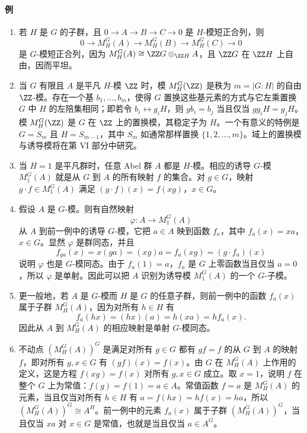\paragraph{例}
\begin{enumerate}[label=(\arabic*)]
  \item 若 $H$ 是 $G$ 的子群，且 $0\to A\to B\to C\to0$ 是 $H$-模短正合列，则
  \[
    0\to M_H^G(A)\to M_H^G(B)\to M_H^G(C)\to0
  \]
  是 $G$-模短正合列，因为 $M_H^G(A)\cong\ZZ G\otimes_{\ZZ H}A$，且 $\ZZ G$ 在 $\ZZ H$ 上自由，因而平坦。
  \item 当 $G$ 有限且 $A$ 是平凡 $H$-模 $\ZZ$ 时，模 $M_H^G(\ZZ)$ 是秩为 $m=|G:H|$ 的自由 $\ZZ$-模。存在一个基 $b_1,
  \ldots,b_m$，使得 $G$ 置换这些基元素的方式与它左乘置换 $G$ 中 $H$ 的左陪集相同；即若令 $b_i\leftrightarrow g_iH$，则 $gb_i=b_j$ 当且仅当 $gg_iH=g_jH$。模 $M_H^G(\ZZ)$ 是 $G$ 在 $\ZZ$ 上的置换模，其稳定子为 $H$。一个有意义的特例是 $G=S_m$ 且 $H=S_{m-1}$，其中 $S_m$ 如通常那样置换 $\{1,2,
  \ldots,m\}$。域上的置换模与诱导模将在第 VI 部分中研究。
  \item 当 $H=1$ 是平凡群时，任意 Abel 群 $A$ 都是 $H$-模。相应的诱导 $G$-模 $M_1^G(A)$ 就是从 $G$ 到 $A$ 的所有映射 $f$ 的集合。对 $g\in G$，映射 $g\cdot f\in M_1^G(A)$ 满足 $(g\cdot f)(x)=f(xg)$，$x\in G$。
  \item 假设 $A$ 是 $G$-模。则有自然映射
  \[
    \varphi:A\to M_1^G(A)
  \]
  从 $A$ 到前一例中的诱导 $G$-模，它把 $a\in A$ 映到函数 $f_a$，其中 $f_a(x)=xa$，$x\in G$。显然 $\varphi$ 是群同态，并且
  \[
    f_{ga}(x)=x(ga)=(xg)a=f_a(xg)=(g\cdot f_a)(x)
  \]
  说明 $\varphi$ 也是 $G$-模同态。由于 $f_a(1)=a$，$f_a$ 是 $G$ 上零函数当且仅当 $a=0$，所以 $\varphi$ 是单射。因此可以把 $A$ 识别为诱导模 $M_1^G(A)$ 的一个 $G$-子模。
  \item 更一般地，若 $A$ 是 $G$-模而 $H$ 是 $G$ 的任意子群，则前一例中的函数 $f_a(x)$ 属于子群 $M_H^G(A)$，因为对所有 $h\in H$ 有
  \[
    f_a(hx)=(hx)(a)=h(xa)=hf_a(x).
  \]
  因此从 $A$ 到 $M_H^G(A)$ 的相应映射是单射 $G$-模同态。
  \item 不动点 $(M_H^G(A))^G$ 是满足对所有 $g\in G$ 都有 $gf=f$ 的从 $G$ 到 $A$ 的映射 $f$，即对所有 $g,x\in G$ 有 $(gf)(x)=f(x)$。由 $G$ 在 $M_H^G(A)$ 上作用的定义，这是方程 $f(xg)=f(x)$ 对所有 $g,x\in G$ 成立。取 $x=1$，说明 $f$ 在整个 $G$ 上为常值：$f(g)=f(1)=a\in A$。常值函数 $f=a$ 是 $M_H^G(A)$ 的元素，当且仅当对所有 $h\in H$ 有 $a=f(hx)=hf(x)=ha$，所以 $(M_H^G(A))^G\cong A^H$。前一例中的元素 $f_a(x)$ 属于子群 $(M_H^G(A))^G$，当且仅当 $xa$ 对 $x\in G$ 是常值，也就是当且仅当 $a\in A^G$。
\end{enumerate}

